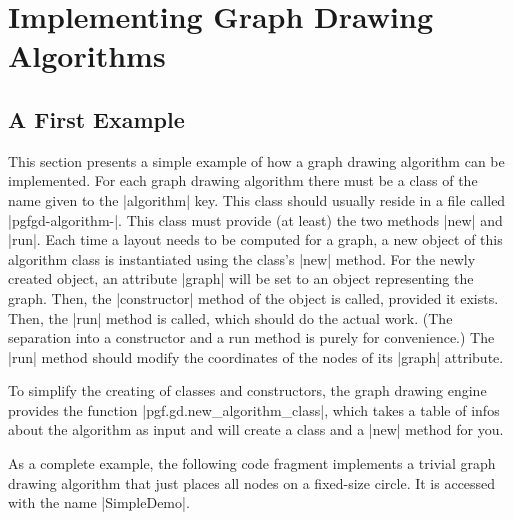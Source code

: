 %
%
%


\section{Implementing Graph Drawing Algorithms}
\label{section-gd-own-algorithm}
\label{section-library-graphdrawing-ownAlgorithm}


\subsection{A First Example}

This section presents a simple example of how a graph drawing
algorithm can be implemented. For each graph drawing algorithm
there must be a class of the name given to the |algorithm| key. This
class should usually reside in a file called
|pgfgd-algorithm-|. This class must provide (at
least) the two methods |new| and |run|. Each time a layout needs to
be computed for a graph, a new object of this algorithm class is
instantiated using the class's |new| method. For the newly created
object, an attribute |graph| will be set to an object representing the
graph. Then, the |constructor| method of the object is called,
provided it exists. Then, the |run| method is called, which should do
the actual work. (The separation into a constructor and a run method
is purely for convenience.) The |run| method should modify the
coordinates of the nodes of its |graph| attribute.

To simplify the creating of classes and constructors, the graph
drawing engine provides the function |pgf.gd.new_algorithm_class|, which
takes a table of infos about the algorithm as input and will create a
class and a |new| method for you.

As a complete example, the following code fragment implements a
trivial graph drawing algorithm that just places all nodes on a
fixed-size circle.  It is accessed with the name 
|SimpleDemo|.


